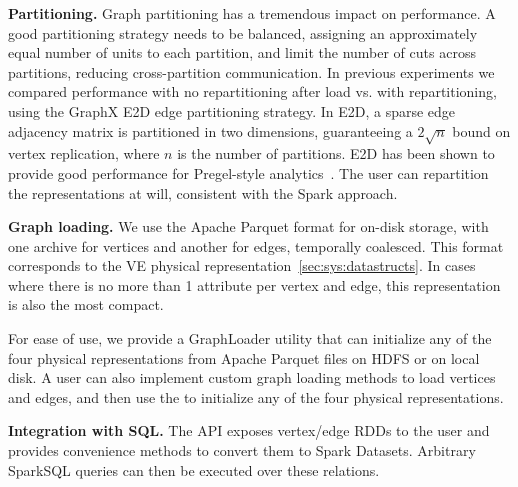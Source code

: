 {\bf Partitioning.}  Graph partitioning has a tremendous impact on
performance.  A good partitioning strategy needs to be balanced,
assigning an approximately equal number of units to each partition,
and limit the number of cuts across partitions, reducing
cross-partition communication.  In previous experiments we compared
performance with no repartitioning after load vs.  with
repartitioning, using the GraphX E2D edge partitioning strategy.  In
E2D, a sparse edge adjacency matrix is partitioned in two dimensions,
guaranteeing a $2 \sqrt{n}$ bound on vertex replication, where $n$ is
the number of partitions. E2D has been shown to provide good
performance for Pregel-style
analytics~\cite{DBLP:conf/osdi/GonzalezXDCFS14,MoffittTempWeb16}.  The
user can repartition the representations at will, consistent with the
Spark approach.

{\bf Graph loading.}  We use the Apache Parquet format for on-disk
storage, with one archive for vertices and another for edges,
temporally coalesced.  This format corresponds to the VE physical
representation~\ref{sec:sys:datastructs}.  In cases where there is no
more than 1 attribute per vertex and edge, this representation is also
the most compact.  

For ease of use, we provide a GraphLoader utility that can initialize
any of the four physical representations from Apache Parquet files on
HDFS or on local disk.  A \ql user can also
implement custom graph loading methods to load vertices and edges, and
then use the  to initialize any of the four physical
representations.

{\bf Integration with SQL.}  The \ql API exposes vertex/edge RDDs to
the user and provides convenience methods to convert them to Spark
Datasets.  Arbitrary SparkSQL queries can then be executed over these
relations.





